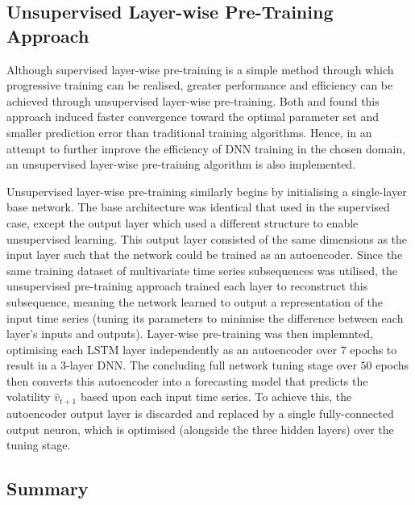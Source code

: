 \documentclass[a4paper, 11pt]{report}
\begin{document}
    \subsection{Unsupervised Layer-wise Pre-Training Approach}

    Although supervised layer-wise pre-training is a simple method through which progressive training can be realised, greater performance and efficiency can be achieved through unsupervised layer-wise pre-training. Both \citet{xu-2018} and \citet{sagheer-2019} found this approach induced faster convergence toward the optimal parameter set and smaller prediction error than traditional training algorithms. Hence, in an attempt to further improve the efficiency of DNN training in the chosen domain, an unsupervised layer-wise pre-training algorithm is also implemented.

    Unsupervised layer-wise pre-training similarly begins by initialising a single-layer base network. The base architecture was identical that used in the supervised case, except the output layer which used a different structure to enable unsupervised learning. This output layer consisted of the same dimensions as the input layer such that the network could be trained as an autoencoder. Since the same training dataset of multivariate time series subsequences was utilised, the unsupervised pre-training approach trained each layer to reconstruct this subsequence, meaning the network learned to output a representation of the input time series (tuning its parameters to minimise the difference between each layer's inputs and outputs). Layer-wise pre-training was then implemnted, optimising each LSTM layer independently as an autoencoder over $7$ epochs to result in a 3-layer DNN. The concluding full network tuning stage over $50$ epochs then converts this autoencoder into a forecasting model that predicts the volatility $\hat{v}_{t+1}$ based upon each input time series. To achieve this, the autoencoder output layer is discarded and replaced by a single fully-connected output neuron, which is optimised (alongside the three hidden layers) over the tuning stage.


    \subsection{Summary}
\end{document}
